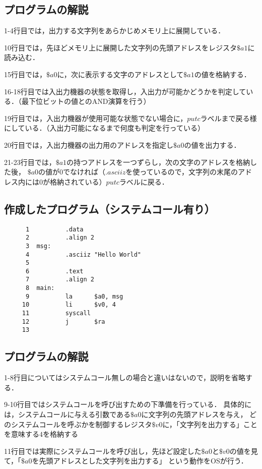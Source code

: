 \documentclass[a4j,11pt]{jarticle}
\begin{document}
\subsection{プログラムの解説}
1-4行目では，出力する文字列をあらかじめメモリ上に展開している．

10行目では，先ほどメモリ上に展開した文字列の先頭アドレスをレジスタ$\$a1$に読み込む．

15行目では，$\$a0$に，次に表示する文字のアドレスとして$\$a1$の値を格納する．

16-18行目では入出力機器の状態を取得し，入出力が可能かどうかを判定している．（最下位ビットの値とのAND演算を行う）

19行目では，入出力機器が使用可能な状態でない場合に，$putc$ラベルまで戻る様にしている．（入出力可能になるまで何度も判定を行っている）

20行目では，入出力機器の出力用のアドレスを指定し$\$a0$の値を出力する．

21-23行目では，$\$a1$の持つアドレスを一つずらし，次の文字のアドレスを格納した後，
$\$a0$の値が$0$でなければ（$.asciiz$を使っているので，文字列の末尾のアドレス内には$0$が格納されている）$putc$ラベルに戻る．

\subsection{作成したプログラム（システムコール有り）}

\begin{verbatim}
      1          .data
      2          .align 2
      3  msg:
      4          .asciiz "Hello World"
      5
      6          .text
      7          .align 2
      8  main:
      9          la      $a0, msg
     10          li      $v0, 4
     11          syscall
     12          j       $ra
     13          
\end{verbatim}

\subsection{プログラムの解説}
1-8行目についてはシステムコール無しの場合と違いはないので，説明を省略する．

9-10行目ではシステムコールを呼び出すための下準備を行っている．
具体的には，システムコールに与える引数である$\$a0$に文字列の先頭アドレスを与え，
どのシステムコールを呼ぶかを制御するレジスタ$\$v0$に，「文字列を出力する」ことを意味する$4$を格納する

11行目では実際にシステムコールを呼び出し，先ほど設定した$\$a0$と$\$v0$の値を見て，「$\$a0$を先頭アドレスとした文字列を出力する」
という動作をOSが行う．
\end{document}
